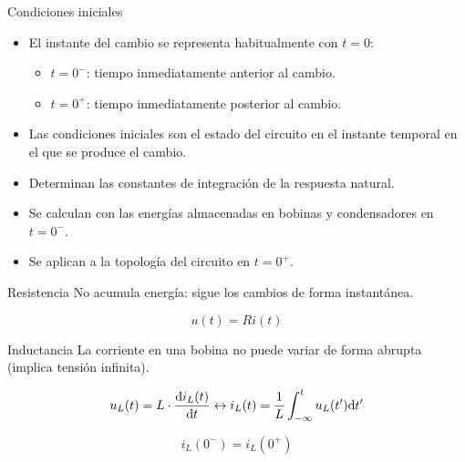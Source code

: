 \documentclass[aspectratio=169, xcolor={usenames,svgnames,dvipsnames}]{beamer}
\begin{document}
\begin{frame}[label={sec:orgd75c6af}]{Condiciones iniciales}
\begin{itemize}
\item El instante del cambio se representa habitualmente con \(t = 0\):
\begin{itemize}
\item \(t = 0^-\): tiempo inmediatamente anterior al cambio.
\item \(t = 0^+\): tiempo inmediatamente posterior al cambio.
\end{itemize}

\item Las \alert{condiciones iniciales} son el estado del circuito en el instante temporal en el que se produce el cambio.

\item Determinan las \alert{constantes de integración} de la respuesta natural.

\item \alert{Se calculan} con las energías almacenadas en bobinas y condensadores en \(t = 0^-\).

\item \alert{Se aplican} a la topología del circuito en \(t = 0^+\).
\end{itemize}
\end{frame}

\begin{frame}[label={sec:org35cc458}]{Resistencia}
No acumula energía: sigue los cambios de forma instantánea.

\[
u(t) = R i(t)
\]
\end{frame}



\begin{frame}[label={sec:org0aafbc3}]{Inductancia}
La corriente en una bobina no puede variar de forma abrupta (implica tensión infinita).

\[
u_L(t) = L \cdot \diff{i_L(t)}{t}
\leftrightarrow
i_L(t) = \frac{1}{L} \int^t_{-\infty}u_L(t') \mathrm{d}t'
\]

\[
\boxed{i_L(0^-) = i_L(0^+)}
\]
\end{frame}
\end{document}
